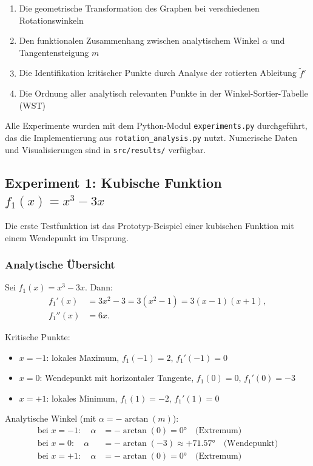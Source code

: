 ﻿\documentclass[12pt, a4paper]{article}
\theoremstyle{definition}
\begin{document}
	\begin{enumerate}[label=\roman*.]
		\item Die geometrische Transformation des Graphen bei verschiedenen Rotationswinkeln
		\item Den funktionalen Zusammenhang zwischen analytischem Winkel $\alpha$ und Tangentensteigung $m$
		\item Die Identifikation kritischer Punkte durch Analyse der rotierten Ableitung $\tilde{f}'$
		\item Die Ordnung aller analytisch relevanten Punkte in der Winkel-Sortier-Tabelle (WST)
	\end{enumerate}
	
	Alle Experimente wurden mit dem Python-Modul \texttt{experiments.py} durchgeführt,
	das die Implementierung aus \texttt{rotation\_analysis.py} nutzt. Numerische Daten
	und Visualisierungen sind in \texttt{src/results/} verfügbar.
	
	\subsection{Experiment 1: Kubische Funktion $f_1(x) = x^3 - 3x$}
	\label{subsec:exp1}
	
	Die erste Testfunktion ist das Prototyp-Beispiel einer kubischen Funktion mit
	einem Wendepunkt im Ursprung.
	
	\subsubsection{Analytische Übersicht}
	
	Sei $f_1(x) = x^3 - 3x$. Dann:
	\begin{align}
		f_1'(x) &= 3x^2 - 3 = 3(x^2 - 1) = 3(x-1)(x+1), \\
		f_1''(x) &= 6x.
	\end{align}
	
	Kritische Punkte:
	\begin{itemize}
		\item $x = -1$: lokales Maximum, $f_1(-1) = 2$, $f_1'(-1) = 0$
		\item $x = 0$: Wendepunkt mit horizontaler Tangente, $f_1(0) = 0$, $f_1'(0) = -3$
		\item $x = +1$: lokales Minimum, $f_1(1) = -2$, $f_1'(1) = 0$
	\end{itemize}
	
	Analytische Winkel (mit $\alpha = -\arctan(m)$):
	\begin{align*}
		\text{bei } x=-1: \quad \alpha &= -\arctan(0) = 0 ° \quad \text{(Extremum)} \\
		\text{bei } x=0: \quad \alpha &= -\arctan(-3) \approx +71.57 ° \quad \text{(Wendepunkt)} \\
		\text{bei } x=+1: \quad \alpha &= -\arctan(0) = 0 ° \quad \text{(Extremum)}
	\end{align*}
	
\end{document}
